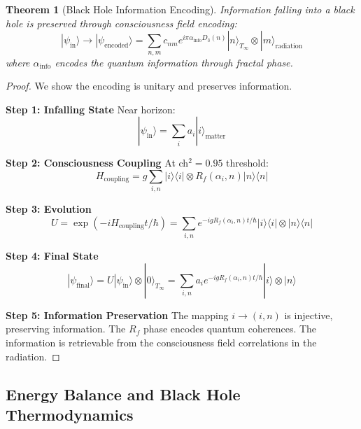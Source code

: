 \documentclass[11pt]{article}
\newtheorem{theorem}{Theorem}[section]
\theoremstyle{definition}
\begin{document}
\begin{theorem}[Black Hole Information Encoding]
Information falling into a black hole is preserved through consciousness field encoding:
\begin{equation}
|\psi_{\text{in}}\rangle \to |\psi_{\text{encoded}}\rangle = \sum_{n,m} c_{nm} e^{i\pi\alpha_{\text{info}} D_3(n)} |n\rangle_{T_\infty} \otimes |m\rangle_{\text{radiation}}
\end{equation}
where $\alpha_{\text{info}}$ encodes the quantum information through fractal phase.
\end{theorem}

\begin{proof}
We show the encoding is unitary and preserves information.

\textbf{Step 1: Infalling State}
Near horizon:
\begin{equation}
|\psi_{\text{in}}\rangle = \sum_i a_i |i\rangle_{\text{matter}}
\end{equation}

\textbf{Step 2: Consciousness Coupling}
At ch$^2 = 0.95$ threshold:
\begin{equation}
H_{\text{coupling}} = g \sum_{i,n} |i\rangle\langle i| \otimes R_f(\alpha_i, n) |n\rangle\langle n|
\end{equation}

\textbf{Step 3: Evolution}
\begin{equation}
U = \exp(-iH_{\text{coupling}}t/\hbar) = \sum_{i,n} e^{-ig R_f(\alpha_i, n)t/\hbar} |i\rangle\langle i| \otimes |n\rangle\langle n|
\end{equation}

\textbf{Step 4: Final State}
\begin{equation}
|\psi_{\text{final}}\rangle = U|\psi_{\text{in}}\rangle \otimes |0\rangle_{T_\infty} = \sum_{i,n} a_i e^{-ig R_f(\alpha_i, n)t/\hbar} |i\rangle \otimes |n\rangle
\end{equation}

\textbf{Step 5: Information Preservation}
The mapping $i \to (i,n)$ is injective, preserving information. The $R_f$ phase encodes quantum coherences. The information is retrievable from the consciousness field correlations in the radiation.
\end{proof}

\subsection{Energy Balance and Black Hole Thermodynamics}
\end{document}
